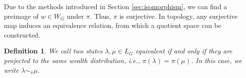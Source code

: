 \documentclass[10pt,twocolumn]{article}
\newtheorem{definition}{Definition}[section]
\newtheorem{lemma}[theorem]{Lemma}
\begin{document}


  

Due to the methods introduced in Section \ref{sec:isomorphism}, we can find a preimage of \( w \in W_G \) under \( \pi \).  
Thus, \( \pi \) is surjective.  
In topology, any surjective map induces an equivalence relation, from which a quotient space can be constructed.  

\begin{definition}
We call two states \( \lambda, \mu \in L_G \) equivalent if and only if they are projected to the same wealth distribution, i.e., \( \pi(\lambda) = \pi(\mu) \).  
In this case, we write \( \lambda \sim_{\pi} \mu \).
\end{definition}
\end{document}
